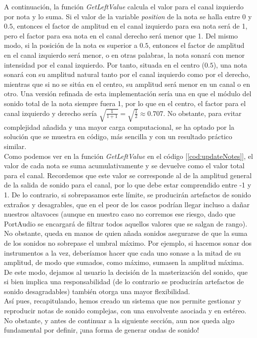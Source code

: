 A continuación, la función \emph{GetLeftValue} calcula el valor para el canal izquierdo por nota y lo suma. Si el valor de la variable \emph{position} de la nota se halla entre 0 y \(0.5\), entonces el factor  de amplitud en el canal izquierdo para esa nota será de 1, pero el factor para esa nota en el canal derecho será menor que 1. Del mismo modo, si la posición de la nota es superior a \(0.5\), entonces el factor de amplitud en el canal izquierdo será menor, o en otras palabras, la nota sonará con menor intensidad por el canal izquierdo. Por tanto, situada en el centro (\(0.5\)), una nota sonará con su amplitud natural tanto por el canal izquierdo como por el derecho, mientras que si no se sitúa en el centro, su amplitud será menor en un canal o en otro. Una versión refinada de esta implementación sería una en que el módulo del sonido total de la nota siempre fuera 1, por lo que en el centro, el factor para el canal izquierdo y derecho sería \(\sqrt{\frac{1}{1 + 1}} = \sqrt{\frac{1}{2}} \approx 0.707\). No obstante, para evitar complejidad añadida y una mayor carga computacional, se ha optado por la solución que se muestra en código, más sencilla y con un resultado práctico similar.\\

Como podemos ver en la función \emph{GetLeftValue} en el código [\ref{cod:updateNotes}], el valor de cada nota se suma acumulativamente y se devuelve como el valor total para el canal. Recordemos que este valor se corresponde al de la amplitud general de la salida de sonido para el canal, por lo que debe estar comprendido entre -1 y 1. De lo contrario, si sobrepasamos este límite, se producirán artefactos de sonido extraños y desagrables, que en el peor de los casos podrían llegar incluso a dañar nuestros altavoces (aunque en nuestro caso no corremos ese riesgo, dado que PortAudio se encargará de filtrar todos aquellos valores que se salgan de rango). No obstante, queda en manos de quien añada sonidos asegurarse de que la suma de los sonidos no sobrepase el umbral máximo. Por ejemplo, si hacemos sonar dos instrumentos a la vez, deberíamos hacer que cada uno sonase a la mitad de su amplitud, de modo que sumados, como máximo, sumasen la amplitud máxima. De este modo, dejamos al usuario la decisión de la masterización del sonido, que si bien implica una responsabilidad (de lo contrario se producirán artefactos de sonido desagradables) también otorga una mayor flexibilidad.\\

Así pues, recapitulando, hemos creado un sistema que nos permite gestionar y reproducir notas de sonido complejas, con una envolvente asociada y en estéreo. No obstante, y antes de continuar a la siguiente sección, aun nos queda algo fundamental por definir, ¡una forma de generar ondas de sonido!\\

